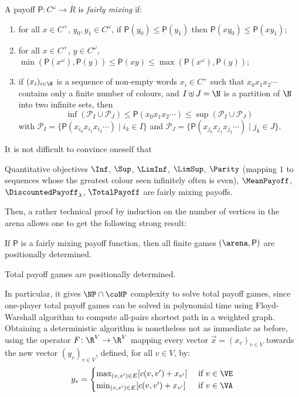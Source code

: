 \begin{definition}\label{4-def:fairly-mixing}
  A payoff $\mathsf{P}\colon C^\omega\to \overline R$ is \emph{fairly
    mixing} if:
  \begin{enumerate}
  \item for all $x\in C^+$, $y_0,y_1\in C^\omega$, if
    $\mathsf{P}(y_0)\leq \mathsf{P}(y_1)$ then
    $\mathsf{P}(xy_0)\leq \mathsf{P}(xy_1)$;
  \item for all $x\in C^+$, $y\in C^\omega$,
    $\min(\mathsf{P}(x^\omega),\mathsf{P}(y)) \leq \mathsf{P}(xy)\leq
    \max(\mathsf{P}(x^\omega),\mathsf{P}(y))$;
  \item if $(x_i)_{i\in \N}$ is a sequence of non-empty words
    $x_i\in C^+$ such that $x_0x_1x_2\cdots$ contains only a finite
    number of colours, and $I\uplus J=\N$ is a partition of $\N$ into two
    infinite sets, then
    \[\inf(\mathcal{P}_I\cup \mathcal{P}_J) \leq
      \mathsf{P}(x_0x_1x_2\cdots) \leq \sup(\mathcal{P}_I\cup
      \mathcal{P}_J)\] with
    $\mathcal P_I=\{\mathsf{P}(x_{i_0}x_{i_1}x_{i_2}\cdots)\mid i_k\in
    I\}$ and
    $\mathcal{P}_J=\{\mathsf{P}(x_{j_0}x_{j_1}x_{j_2}\cdots)\mid
    j_k\in J\}$.
  \end{enumerate}
\end{definition}

It is not difficult to convince oneself that
\begin{proposition}\label{4-prop:objectives-fairly}
  Quantitative objectives $\Inf$, $\Sup$, $\LimInf$, $\LimSup$,
  $\Parity$ (mapping $1$ to sequences whose the greatest colour seen
  infinitely often is even), $\MeanPayoff$,
  $\DiscountedPayoff_\lambda$, $\TotalPayoff$ are fairly mixing
  payoffs.
\end{proposition}

Then, a rather technical proof by induction on the number of vertices
in the arena allows one to get the following strong result:
\cite{Gimbert&Zielonka:2004}
\begin{theorem}\label{4-thm:fairly-mixing}
  If $\mathsf P$ is a fairly mixing payoff function, then all finite
  games $(\arena,\mathsf P)$ are positionally determined.
\end{theorem}

\begin{corollary}\label{4-cor:TP-determinacy}
  Total payoff games are positionally determined.
\end{corollary}

In particular, it gives $\NP\cap\coNP$ complexity to solve
total payoff games, since one-player total payoff games can be solved
in polynomial time using Floyd-Warshall algorithm to compute all-pairs
shortest path in a weighted graph. Obtaining a deterministic algorithm
is nonetheless not as immediate as before, using the operator
$F\colon \R^V\to \R^V$ mapping every vector $\vec x=(x_v)_{v\in V}$
towards the new vector $(y_v)_{v\in V}$, defined, for all $v\in V$,
by:
\[y_v =
  \begin{cases}
    \max_{(v,v')\in E} [c(v,v') + x_{v'}] &
    \text{ if } v\in \VE\\
    \min_{(v,v')\in E} [c(v,v') + x_{v'}] & \text{ if } v\in \VA
  \end{cases}\]

